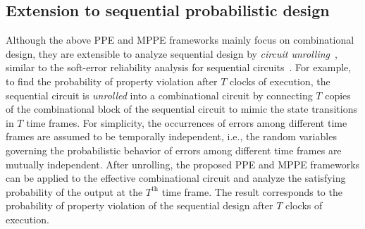 \subsection{Extension to sequential probabilistic design}
Although the above PPE and MPPE frameworks mainly focus on combinational design,
they are extensible to analyze sequential design by \textit{circuit unrolling}~\cite{Clarke2001},
similar to the soft-error reliability analysis for sequential circuits~\cite{Miskov-Zivanov2008}.
For example,
to find the probability of property violation after $T$ clocks of execution,
the sequential circuit is \textit{unrolled} into a combinational circuit by connecting $T$ copies of the combinational block of the sequential circuit to mimic the state transitions in $T$ time frames.
For simplicity,
the occurrences of errors among different time frames are assumed to be temporally independent,
i.e., the random variables governing the probabilistic behavior of errors among different time frames are mutually independent.
After unrolling,
the proposed PPE and MPPE frameworks can be applied to the effective combinational circuit and
analyze the satisfying probability of the output at the $T^\mathrm{th}$ time frame.
The result corresponds to the probability of property violation of the sequential design after $T$ clocks of execution.